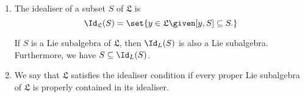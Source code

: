 \begin{enumerate}[label=(\alph*)]
	\item The idealiser of a subset $S$ of $\mathfrak{L}$ is
		\[ \Id_{\mathfrak{L}}(S) = \set{y \in \mathfrak{L}\given [y, S] \subseteq S.} \]

		If $S$ is a Lie subalgebra of $\mathfrak{L}$, then $\Id_L(S)$ is also
		a Lie subalgebra. Furthermore, we have $S \subseteq \Id_L(S)$.

	\item We say that $\mathfrak{L}$ satisfies the idealiser condition if every
		proper Lie subalgebra of $\mathfrak{L}$ is properly contained in its
		idealiser.
\end{enumerate}
